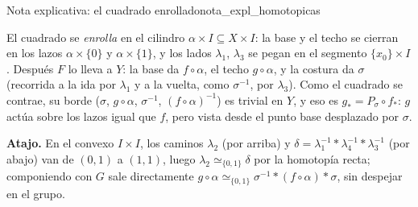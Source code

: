 \begin{nota}{Nota explicativa: el cuadrado enrollado}{nota_expl_homotopicas}
\begin{center}
\end{center}
El cuadrado se \emph{enrolla} en el cilindro $\alpha \times I \subseteq X \times I$: la base y el techo se cierran en los lazos $\alpha \times \{0\}$ y $\alpha \times \{1\}$, y los lados $\lambda_1$, $\lambda_3$ se pegan en el segmento $\{x_0\} \times I$. Después $F$ lo lleva a $Y$: la base da $f \circ \alpha$, el techo $g \circ \alpha$, y la costura da $\sigma$ (recorrida a la ida por $\lambda_1$ y a la vuelta, como $\sigma^{-1}$, por $\lambda_3$). Como el cuadrado se contrae, su borde ($\sigma$, $g \circ \alpha$, $\sigma^{-1}$, $(f \circ \alpha)^{-1}$) es trivial en $Y$, y eso es $g_* = P_\sigma \circ f_*$: $g$ actúa sobre los lazos igual que $f$, pero vista desde el punto base desplazado por $\sigma$.

\textbf{Atajo.} En el convexo $I\times I$, los caminos $\lambda_2$ (por arriba) y $\delta=\lambda_1^{-1}*\lambda_4^{-1}*\lambda_3^{-1}$ (por abajo) van de $(0,1)$ a $(1,1)$, luego $\lambda_2\simeq_{\{0,1\}}\delta$ por la homotopía recta; componiendo con $G$ sale directamente $g\circ\alpha\simeq_{\{0,1\}}\sigma^{-1}*(f\circ\alpha)*\sigma$, sin despejar en el grupo.
\end{nota}


